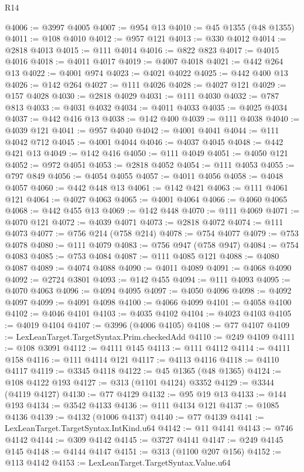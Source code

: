 \begin{lexlean}{R14}
\begin{coremodule}
@4006 := @3997 @4005
@4007 := @954 @13
@4010 := @45 @1355 (@48 @1355)
@4011 := @108 @4010
@4012 := @957 @121
@4013 := @330 @4012
@4014 := @2818 @4013
@4015 := @111 @4014
@4016 := @822 @823
@4017 := @4015 @4016
@4018 := @4011 @4017
@4019 := @4007 @4018
@4021 := @442 @264 @13
@4022 := @4001 @974
@4023 := @4021 @4022
@4025 := @442 @400 @13
@4026 := @142 @264
@4027 := @111 @4026
@4028 := @4027 @121
@4029 := @157 @4028
@4030 := @2818 @4029
@4031 := @111 @4030
@4032 := @787 @813
@4033 := @4031 @4032
@4034 := @4011 @4033
@4035 := @4025 @4034
@4037 := @442 @416 @13
@4038 := @142 @400
@4039 := @111 @4038
@4040 := @4039 @121
@4041 := @957 @4040
@4042 := @4001 @4041
@4044 := @111 @4042 @712
@4045 := @4001 @4044
@4046 := @4037 @4045
@4048 := @442 @421 @13
@4049 := @142 @416
@4050 := @111 @4049
@4051 := @4050 @121
@4052 := @972 @4051
@4053 := @2818 @4052
@4054 := @111 @4053
@4055 := @797 @849
@4056 := @4054 @4055
@4057 := @4011 @4056
@4058 := @4048 @4057
@4060 := @442 @448 @13
@4061 := @142 @421
@4063 := @111 @4061 @121
@4064 := @4027 @4063
@4065 := @4001 @4064
@4066 := @4060 @4065
@4068 := @442 @455 @13
@4069 := @142 @448
@4070 := @111 @4069
@4071 := @4070 @121
@4072 := @4039 @4071
@4073 := @2818 @4072
@4074 := @111 @4073
@4077 := @756 @214 (@758 @214)
@4078 := @754 @4077
@4079 := @753 @4078
@4080 := @111 @4079
@4083 := @756 @947 (@758 @947)
@4084 := @754 @4083
@4085 := @753 @4084
@4087 := @111 @4085 @121
@4088 := @4080 @4087
@4089 := @4074 @4088
@4090 := @4011 @4089
@4091 := @4068 @4090
@4092 := @2724 @3801
@4093 := @142 @455
@4094 := @111 @4093
@4095 := @4070 @4063
@4096 := @4094 @4095
@4097 := @4050 @4096
@4098 := @4092 @4097
@4099 := @4091 @4098
@4100 := @4066 @4099
@4101 := @4058 @4100
@4102 := @4046 @4101
@4103 := @4035 @4102
@4104 := @4023 @4103
@4105 := @4019 @4104
@4107 := @3996 (@4006 @4105)
@4108 := @77 @4107
@4109 := LexLeanTarget.TargetSyntax.Prim.checkedAdd
@4110 := @249 @4109
@4111 := @108 @3091
@4112 := @4111 @145
@4113 := @111 @4112
@4114 := @4111 @158
@4116 := @111 @4114 @121
@4117 := @4113 @4116
@4118 := @4110 @4117
@4119 := @3345 @4118
@4122 := @45 @1365 (@48 @1365)
@4124 := @108 @4122 @193
@4127 := @313 (@1101 @4124) @3352
@4129 := @3344 (@4119 @4127)
@4130 := @77 @4129
@4132 := @95 @19 @13
@4133 := @144 @193
@4134 := @3542 @4133
@4136 := @111 @4134 @121
@4137 := @1085 @4136
@4139 := @4132 (@1006 @4137)
@4140 := @77 @4139
@4141 := LexLeanTarget.TargetSyntax.IntKind.u64
@4142 := @11 @4141
@4143 := @746 @4142
@4144 := @309 @4142
@4145 := @3727 @4141
@4147 := @249 @4145 @145
@4148 := @4144 @4147
@4151 := @313 (@1100 @207 @156)
@4152 := @113 @4142
@4153 := LexLeanTarget.TargetSyntax.Value.u64

\end{coremodule}
\end{lexlean}

